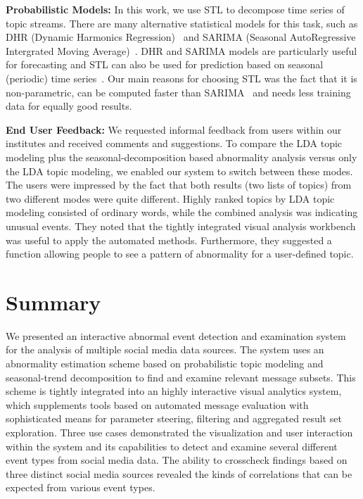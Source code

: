 \textbf{Probabilistic Models:} In this work, we use STL to decompose time series of topic streams.
There are many alternative statistical models for this task, such as DHR (Dynamic Harmonics Regression)~\cite{Young:1999:DHR} and SARIMA (Seasonal AutoRegressive Intergrated Moving Average)~\cite{Box:1990:TSA}.
DHR and SARIMA models are particularly useful for forecasting and STL can also be used for prediction based on seasonal (periodic) time series~\cite{Jiang:2010:MML}.
Our main reasons for choosing STL was the fact that it is non-parametric, can be computed faster than SARIMA~\cite{Jiang:2010:MML} and needs less training data for equally good results.

\textbf{End User Feedback:} We requested informal feedback from users within our institutes and received comments and suggestions. 
To compare the LDA topic modeling plus the seasonal-decomposition based abnormality analysis versus only the LDA topic modeling, we enabled our system to switch between these modes. 
The users were impressed by the fact that both results (two lists of topics) from two different modes were quite different. 
Highly ranked topics by LDA topic modeling consisted of ordinary words, while the combined analysis was indicating unusual events. 
They noted that the tightly integrated visual analysis workbench was useful to apply the automated methods. 
Furthermore, they suggested a function allowing people to see a pattern of abnormality for a user-defined topic.

\section{Summary}
\label{sec:concl}
We presented an interactive abnormal event detection and examination system for the analysis of multiple social media data sources.
The system uses an abnormality estimation scheme based on probabilistic topic modeling and seasonal-trend decomposition to find and examine relevant message subsets. This scheme is tightly integrated into an highly interactive visual analytics system, which supplements tools based on automated message evaluation with sophisticated means for parameter steering, filtering and aggregated result set exploration.
Three use cases demonstrated the visualization and user interaction within the system and its capabilities to detect and examine several different event types from social media data.
The ability to crosscheck findings based on three distinct social media sources revealed the kinds of correlations that can be expected from various event types.

